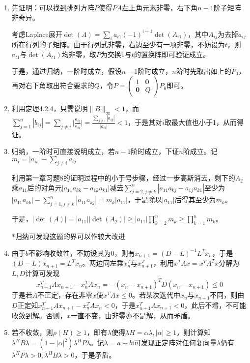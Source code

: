 \documentclass[a4paper,UTF8,fontset=windows]{ctexart}
\begin{document}
\begin{enumerate}
\item
先证明：可以找到排列方阵$P$使得$PA$左上角元素非零，右下角$n-1$阶子矩阵非奇异。

考虑Laplace展开$\det(A)=\sum_ia_{i1}(-1)^{i+1}\det(A_{i1})$，其中$A_{ij}$为去掉$a_{ij}$所在行列的子矩阵。由于行列式非零，右边至少有一项非零，不妨设为$t$，则$a_{t1}$与$\det(A_{t1})$均非零，取$P$为交换1与$t$的置换阵即可验证成立。

于是，通过归纳，一阶时成立，假设$n-1$阶时成立，$n$阶时先取出如上的$P_0$，再对右下角取出符合要求的$Q$，令$P=\begin{pmatrix}1&\mathbf{0}\\\mathbf{0}&Q\end{pmatrix}P_0$即可。

\item
利用定理4.2.4，只需说明$\|B\|_\infty<1$，而$\sum_{j=1}^n|b_{ij}|=\sum_{j\ne i}\big|\frac{a_{ij}}{a_{ii}}\big|=\frac{\sum_{j\ne i}|a_{ij}|}{|a_{ii}|}<1$，于是其对$i$取最大值也小于1，从而得证。

\item
归纳，一阶时可直接说明成立，若$n-1$阶时成立，下证$n$阶成立。记$m_i=|a_{ii}|-\sum_{j\ne i}a_{ij}$

利用第一章习题8的证明过程中的小于号步骤，经过一步高斯消去，剩下的$A_2$乘$a_{11}$后的对角元$|a_{11}a_{kk}-a_{1k}a_{k1}|$减去$\sum_{j=2,j\ne k}^{n}|a_{11}a_{kj}-a_{1j}a_{k1}|$至少为$|a_{11}a_{kk}|-\sum_{j=1,j\ne k}^{n}|a_{11}a_{kj}|=m_k|a_{11}|$，于是除以$|a_{11}|$后得其至少为$m_k$。

于是，$|\det(A)|=|a_{11}||\det(A_2)|\ge|a_{11}|\prod_{k=2}^nm_k\ge\prod_{k=1}^nm_k$。

*归纳可发现这题的界可以作较大改进

\item
由于$b$不影响收敛性，不妨设其为0，则有$x_{n+1}=(D-L)^{-1}L^Tx_n$，于是$(D-L)x_{n+1}=L^Tx_n$。两边同左乘$x_n^T$与$x_{n+1}^T$，利用$x^TAx=x^TA^Tx$分解为$L,D$计算可发现
$$x_{n+1}^TAx_{n+1}-x_n^TAx_n=-(x_n-x_{n+1})^TD(x_n-x_{n+1})\le0$$
于是若$A$不正定，存在非零$x$使$x^TAx\le0$。若某次迭代中$x_n$与$x_{n+1}$不同，则由$D$正定知$x_{n+1}^TAx_{n+1}-x_n^TAx_n<0$，于是$x_{n+1}^TAx_{n+1}<0$，此后不增，不可能收敛到解。否则，$x$一直不变，由非零亦不是解，从而矛盾。

\item
若不收敛，则$\rho(H)\ge1$，即有$\lambda$使得$\lambda H=\alpha\lambda,|\alpha|\ge1$，则计算知$\lambda^HB\lambda=(1-|\alpha|^2)\lambda^HP\lambda$。记$\lambda=a+b\mathrm{i}$可发现正定阵对任何复向量$\lambda$仍有$\lambda^HP\lambda>0,\lambda^HB\lambda>0$，于是矛盾。


\end{enumerate}
\end{document}
